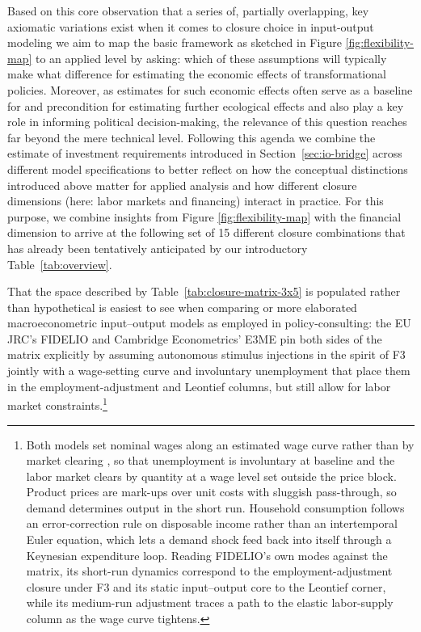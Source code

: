 

Based on this core observation that a series of, partially overlapping, key axiomatic variations \citep{Kapeller.2013} exist when it comes to closure choice in input-output modeling we aim to map the basic framework as sketched in Figure \ref{fig:flexibility-map} to an applied level by asking: which of these assumptions will typically make what difference for estimating the economic effects of transformational policies. Moreover, as estimates for such economic effects often serve as a baseline for and precondition for estimating further ecological effects and also play a key role in informing political decision-making, the relevance of this question reaches far beyond the mere technical level. Following this agenda we combine the estimate of investment requirements introduced in Section~\ref{sec:io-bridge} across different model specifications to better reflect on how the conceptual distinctions introduced above matter for applied analysis and how different closure dimensions (here: labor markets and financing) interact in practice. For this purpose, we combine insights from Figure \ref{fig:flexibility-map} with the financial dimension to arrive at the following set of 15 different closure combinations that has already been tentatively anticipated by our introductory Table~\ref{tab:overview}.



 That the space described by Table~\ref{tab:closure-matrix-3x5} is populated rather than hypothetical is easiest to see when comparing or more elaborated macroeconometric input--output models as employed in policy-consulting: the EU JRC's FIDELIO \citep{Rocchi.2019, Rocchi.2025} and Cambridge Econometrics' E3ME \citep{E3ME.2022} pin both sides of the matrix explicitly by assuming autonomous stimulus injections in the spirit of F3 jointly with a wage-setting curve and involuntary unemployment that place them in the employment-adjustment and Leontief columns, but still allow for labor market constraints.\footnote{Both models set nominal wages along an estimated wage curve rather than by market clearing \citep{BlanchflowerOswald.1995}, so that unemployment is involuntary at baseline and the labor market clears by quantity at a wage level set outside the price block. Product prices are mark-ups over unit costs with sluggish pass-through, so demand determines output in the short run. Household consumption follows an error-correction rule on disposable income rather than an intertemporal Euler equation, which lets a demand shock feed back into itself through a Keynesian expenditure loop. Reading FIDELIO's own modes against the matrix, its short-run dynamics correspond to the employment-adjustment closure under F3 and its static input--output core to the Leontief corner, while its medium-run adjustment traces a path to the elastic labor-supply column as the wage curve tightens.}


